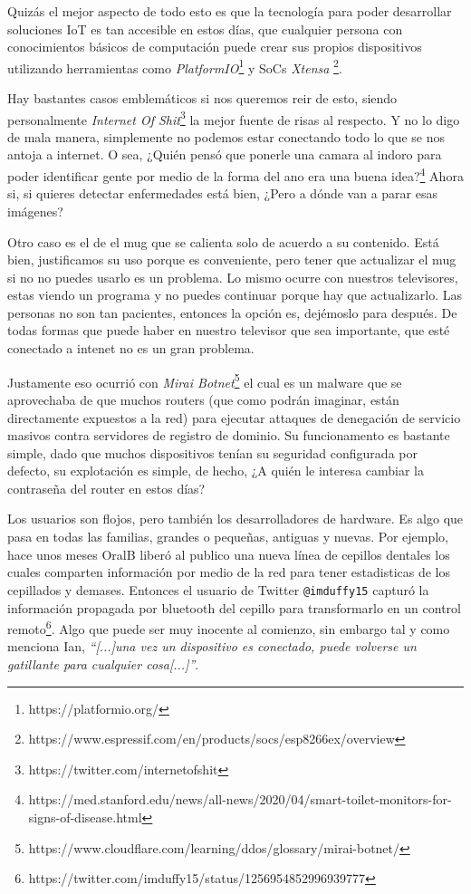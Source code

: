 \documentclass[11pt]{utalcaDoc}
\begin{document}
Quizás el mejor aspecto de todo esto es que la tecnología para poder desarrollar soluciones IoT es tan accesible en estos días, que cualquier persona con conocimientos básicos de computación puede crear sus propios dispositivos utilizando herramientas como \textit{PlatformIO}\footnote{https://platformio.org/} y SoCs \textit{Xtensa} \footnote{https://www.espressif.com/en/products/socs/esp8266ex/overview}.

Hay bastantes casos emblemáticos si nos queremos reir de esto, siendo personalmente \textit{Internet Of Shit}\footnote{https://twitter.com/internetofshit} la mejor fuente de risas al respecto. Y no lo digo de mala manera, simplemente no podemos estar conectando todo lo que se nos antoja a internet. O sea, ¿Quién pensó que ponerle una camara al indoro para poder identificar gente por medio de la forma del ano era una buena idea?\footnote{https://med.stanford.edu/news/all-news/2020/04/smart-toilet-monitors-for-signs-of-disease.html} Ahora si, si quieres detectar enfermedades está bien, ¿Pero a dónde van a parar esas imágenes?

Otro caso es el de el mug que se calienta solo de acuerdo a su contenido. Está bien, justificamos su uso porque es conveniente, pero tener que actualizar el mug si no no puedes usarlo es un problema. Lo mismo ocurre con nuestros televisores, estas viendo un programa y no puedes continuar porque hay que actualizarlo. Las personas no son tan pacientes, entonces la opción es, dejémoslo para después. De todas formas que puede haber en nuestro televisor que sea importante, que esté conectado a intenet no es un gran problema.

Justamente eso ocurrió con \textit{Mirai Botnet}\footnote{https://www.cloudflare.com/learning/ddos/glossary/mirai-botnet/} el cual es un malware que se aprovechaba de que muchos routers (que como podrán imaginar, están directamente expuestos a la red) para ejecutar attaques de denegación de servicio masivos contra servidores de registro de dominio. Su funcionamento es bastante simple, dado que muchos dispositivos tenían su seguridad configurada por defecto, su explotación es simple, de hecho, ¿A quién le interesa cambiar la contraseña del router en estos días?

Los usuarios son flojos, pero también los desarrolladores de hardware. Es algo que pasa en todas las familias, grandes o pequeñas, antiguas y nuevas. Por ejemplo, hace unos meses OralB liberó al publico una nueva línea de cepillos dentales los cuales comparten información por medio de la red para tener estadisticas de los cepillados y demases. Entonces el usuario de Twitter \texttt{@imduffy15} capturó la información propagada por bluetooth del cepillo para transformarlo en un control remoto\footnote{https://twitter.com/imduffy15/status/1256954852996939777}. Algo que puede ser muy inocente al comienzo, sin embargo tal y como menciona Ian, \textit{``[...]una vez un dispositivo es conectado, puede volverse un gatillante para cualquier cosa[...]''}.
\end{document}
